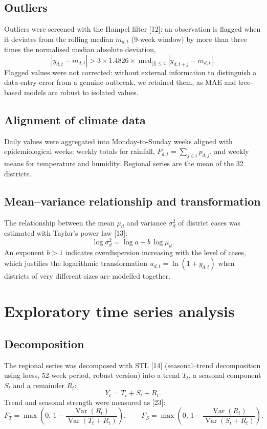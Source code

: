 \documentclass[11pt]{article}
\begin{document}
\subsection{Outliers}
Outliers were screened with the Hampel filter [12]: an observation is flagged when it deviates from the rolling median $\tilde{m}_{d,t}$ (9-week window) by more than three times the normalised median absolute deviation,
\begin{equation}
\left|y_{d,t}-\tilde{m}_{d,t}\right|>3\times1.4826\times\operatorname{med}_{|j|\le4}\left|y_{d,t+j}-\tilde{m}_{d,t}\right|.
\label{eq:hampel}
\end{equation}
Flagged values were not corrected: without external information to distinguish a data-entry error from a genuine outbreak, we retained them, as MAE and tree-based models are robust to isolated values.

\subsection{Alignment of climate data}
Daily values were aggregated into Monday-to-Sunday weeks aligned with epidemiological weeks: weekly totals for rainfall, $P_{d,t}=\sum_{j\in t}p_{d,j}$, and weekly means for temperature and humidity. Regional series are the mean of the 32 districts.

\subsection{Mean–variance relationship and transformation}
The relationship between the mean $\mu_d$ and variance $\sigma^2_d$ of district cases was estimated with Taylor's power law [13]:
\begin{equation}
\log\sigma^2_d=\log a+b\,\log\mu_d .
\label{eq:taylor}
\end{equation}
An exponent $b>1$ indicates overdispersion increasing with the level of cases, which justifies the logarithmic transformation $u_{d,t}=\ln(1+y_{d,t})$ when districts of very different sizes are modelled together.

\section{Exploratory time series analysis}
\subsection{Decomposition}
The regional series was decomposed with STL [14] (seasonal–trend decomposition using loess, 52-week period, robust version) into a trend $T_t$, a seasonal component $S_t$ and a remainder $R_t$:
\begin{equation}
Y_t=T_t+S_t+R_t .
\label{eq:stl}
\end{equation}
Trend and seasonal strength were measured as [23]:
\begin{equation}
F_T=\max\!\left(0,\,1-\frac{\operatorname{Var}(R_t)}{\operatorname{Var}(T_t+R_t)}\right),\qquad F_S=\max\!\left(0,\,1-\frac{\operatorname{Var}(R_t)}{\operatorname{Var}(S_t+R_t)}\right).
\label{eq:force}
\end{equation}
\end{document}
